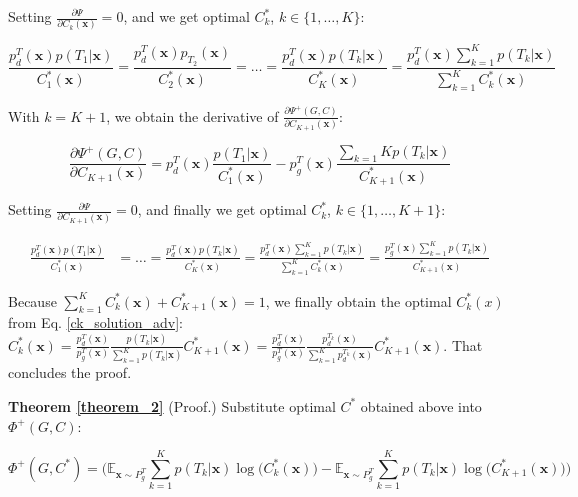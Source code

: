 \documentclass{article}
\begin{document}
Setting $\frac{\partial\Psi}{\partial C_k(\mathbf{x})} = 0$, and we get optimal $C_k^*$, $k \in \{1, \dots, K\}$:

\begin{equation}
\frac{p_d^T(\mathbf{x})p({T_1}|\mathbf{x})}{C^*_1(\mathbf{x})} = \frac{p_d^T(\mathbf{x})p_{T_2}(\mathbf{x})}{C^*_2(\mathbf{x})} = \dots = \frac{p_d^T(\mathbf{x})p({T_k}|\mathbf{x})}{C^*_K(\mathbf{x})} = \frac{ p_d^T(\mathbf{x})\sum_{k=1}^{K}p({T_k}|\mathbf{x})}{\sum_{k=1}^{K}C^*_k(\mathbf{x})}
\label{ck_solution_adv}
\end{equation}

With $k = K+1$, we obtain the derivative of $\frac{\partial\Psi^+(G,C)}{\partial C_{K+1}(\mathbf{x})}$:

\begin{equation}
\frac{\partial\Psi^+(G,C)}{\partial C_{K+1}(\mathbf{x})} = p_d^T(\mathbf{x})\frac{p({T_1}|\mathbf{x})}{C^*_1(\mathbf{x})} - p_g^T(\mathbf{x})\frac{\sum_{k=1}{K}p({T_k}|\mathbf{x})}{C^*_{K+1}(\mathbf{x})}
\end{equation}

Setting $\frac{\partial\Psi}{\partial C_{K+1}(\mathbf{x})} = 0$, and finally we get optimal $C_k^*$, $k \in \{1, \dots, K+1\}$:

\begin{equation}
\begin{split}
\frac{p_d^T(\mathbf{x})p({T_1}|\mathbf{x})}{C^*_1(\mathbf{x})} &= \dots = \frac{p_d^T(\mathbf{x})p({T_k}|\mathbf{x})}{C^*_K(\mathbf{x})} = \frac{ p_d^T(\mathbf{x})\sum_{k=1}^{K}p({T_k}|\mathbf{x})}{\sum_{k=1}^{K}C^*_k(\mathbf{x})} = \frac{p_g^T(\mathbf{x})\sum_{k=1}^{K}p({T_k}|\mathbf{x})}{C^*_{K+1}(\mathbf{x})}
\end{split}
\label{ck_solution_adv_kpus1}
\end{equation}

Because $\sum_{k=1}^{K}C^*_k(\mathbf{x}) + C^*_{K+1}(\mathbf{x}) = 1$, we finally obtain the optimal $C_k^*(x)$ from Eq. \ref{ck_solution_adv}: $C^*_k(\mathbf{x}) = \frac{p_d^T(\mathbf{x})}{p_g^T(\mathbf{x})}\frac{p({T_k}|\mathbf{x})}{\sum_{k=1}^{K}p({T_k}|\mathbf{x})} C^*_{K+1}(\mathbf{x}) = \frac{p_d^T(\mathbf{x})}{p_g^T(\mathbf{x})}\frac{p_d^{T_k}(\mathbf{x})}{\sum_{k=1}^{K}p_d^{T_k}(\mathbf{x})} C^*_{K+1}(\mathbf{x})$. That concludes the proof.

\noindent \textbf{Theorem \ref{theorem_2}} (Proof.) Substitute optimal $C^*$ obtained above into  $\Phi^+(G,C)$:

\begin{equation}
\Phi^+(G,C^*) = \bigg(\mathbb{E}_{\mathbf{x} \sim {P_g^T}}\sum_{k=1}^{K}p({T_k}|\mathbf{x})\log\Big(C^*_k(\mathbf{x})\Big) - \mathbb{E}_{\mathbf{x} \sim P_g^T}\sum_{k=1}^{K}p({T_k}|\mathbf{x})\log\Big(C^*_{K+1}(\mathbf{x})\Big)\bigg)
\end{equation}
\end{document}
